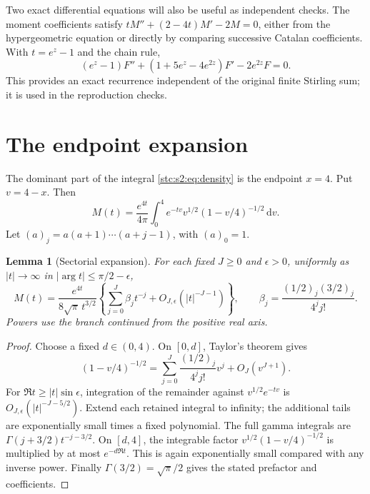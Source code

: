 \documentclass[11pt,letterpaper]{article}
\numberwithin{equation}{section}
\newtheorem{lemma}[theorem]{Lemma}
\theoremstyle{remark}\newtheorem{remark}[theorem]{Remark}
\newcommand{\dd}{\,\mathrm d}
\begin{document}
Two exact differential equations will also be useful as independent checks. The moment coefficients satisfy $tM''+(2-4t)M'-2M=0$, either from the hypergeometric equation or directly by comparing successive Catalan coefficients. With $t=e^z-1$ and the chain rule,
\begin{equation}\label{stc:s2:eq:ode}
 (e^z-1)F''+(1+5e^z-4e^{2z})F'-2e^{2z}F=0.
\end{equation}
This provides an exact recurrence independent of the original finite Stirling sum; it is used in the reproduction checks.

\section{The endpoint expansion}\label{stc:s2:sec:endpoint}
The dominant part of the integral \eqref{stc:s2:eq:density} is the endpoint $x=4$. Put $v=4-x$. Then
\begin{equation}\label{stc:s2:eq:endpoint-integral}
 M(t)=\frac{e^{4t}}{4\pi}\int_0^4e^{-tv}v^{1/2}(1-v/4)^{-1/2}\dd v.
\end{equation}
Let $(a)_j=a(a+1)\cdots(a+j-1)$, with $(a)_0=1$.

\begin{lemma}[Sectorial expansion]\label{stc:s2:lem:endpoint}
For each fixed $J\ge0$ and $\epsilon>0$, uniformly as $|t|\to\infty$ in $|\arg t|\le\pi/2-\epsilon$,
\begin{equation}\label{stc:s2:eq:endpoint-exp}
 M(t)=\frac{e^{4t}}{8\sqrt\pi\,t^{3/2}}
 \left\{\sum_{j=0}^J\beta_jt^{-j}+O_{J,\epsilon}(|t|^{-J-1})\right\},
 \qquad \beta_j=\frac{(1/2)_j(3/2)_j}{4^j j!}.
\end{equation}
Powers use the branch continued from the positive real axis.
\end{lemma}
\begin{proof}
Choose a fixed $d\in(0,4)$. On $[0,d]$, Taylor's theorem gives
\[
 (1-v/4)^{-1/2}=\sum_{j=0}^J\frac{(1/2)_j}{4^j j!}v^j+O_J(v^{J+1}).
\]
For $\Re t\ge |t|\sin\epsilon$, integration of the remainder against $v^{1/2}e^{-tv}$ is $O_{J,\epsilon}(|t|^{-J-5/2})$. Extend each retained integral to infinity; the additional tails are exponentially small times a fixed polynomial. The full gamma integrals are $\Gamma(j+3/2)t^{-j-3/2}$. On $[d,4]$, the integrable factor $v^{1/2}(1-v/4)^{-1/2}$ is multiplied by at most $e^{-d\Re t}$. This is again exponentially small compared with any inverse power. Finally $\Gamma(3/2)=\sqrt\pi/2$ gives the stated prefactor and coefficients.
\end{proof}
\end{document}
